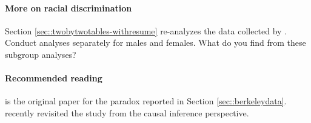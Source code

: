 \paragraph{More on racial discrimination}

Section \ref{sec::twobytwotables-withresume} re-analyzes the data collected by \citet{bertrand2004emily}. Conduct analyses separately for males and females. What do you find from these subgroup analyses?


\paragraph{Recommended reading}

\citet{bickel1975sex} is the original paper for the paradox reported in Section \ref{sec::berkeleydata}. 
\citet{pearl2018book} recently revisited the study from the causal inference perspective. 



